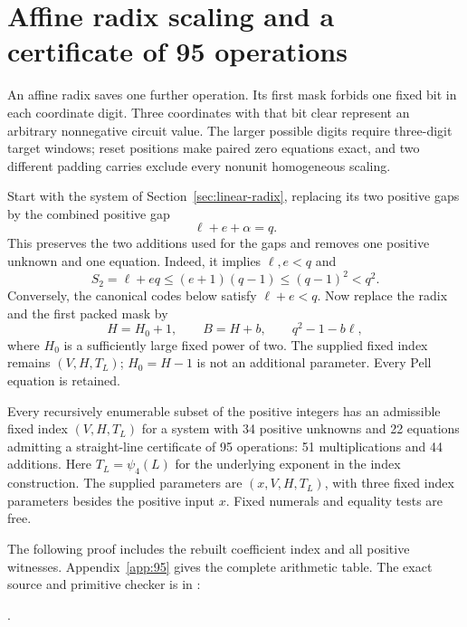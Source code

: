 \section{Affine radix scaling and a certificate of 95 operations}
\label{sec:affine-radix}

An affine radix saves one further operation. Its first mask forbids
one fixed bit in each coordinate digit. Three coordinates with that
bit clear represent an arbitrary nonnegative circuit value. The
larger possible digits require three-digit target windows; reset
positions make paired zero equations exact, and two different
padding carries exclude every nonunit homogeneous scaling.

Start with the system of Section~\ref{sec:linear-radix}, replacing
its two positive gaps by the combined positive gap
\begin{equation}\label{eq:affine-radix-gap}
 \ell+e+\alpha=q.
\end{equation}
This preserves the two additions used for the gaps and removes
one positive unknown and one equation. Indeed, it implies
$\ell,e<q$ and
\[
 S_2=\ell+eq\le(e+1)(q-1)\le(q-1)^2<q^2.
\]
Conversely, the canonical codes below satisfy $\ell+e<q$.
Now replace the radix and the first packed mask by
\begin{equation}\label{eq:affine-radix-change}
 H=H_0+1,\qquad B=H+b,\qquad q^2-1-b\ell,
\end{equation}
where $H_0$ is a sufficiently large fixed power of two. The
supplied fixed index remains $(V,H,T_L)$; $H_0=H-1$ is not an
additional parameter. Every Pell equation is retained.

\begin{theorem}\label{thm:best95}
Every recursively enumerable subset of the positive integers has
an admissible fixed index $(V,H,T_L)$ for a system with 34 positive
unknowns and 22 equations admitting a straight-line certificate of
95 operations: 51 multiplications and 44 additions. Here
$T_L=\psi_4(L)$ for the underlying exponent in the index
construction. The supplied parameters are $(x,V,H,T_L)$, with
three fixed index parameters besides the positive input $x$.
Fixed numerals and equality tests are free.
\end{theorem}

The following proof includes the rebuilt coefficient index and
all positive witnesses. Appendix~\ref{app:95} gives the complete
arithmetic table. The exact source and primitive checker is in
:
\begin{center}
\small{}.
\end{center}

